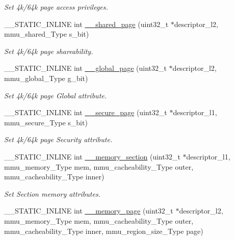 \begin{DoxyCompactItemize}
\begin{DoxyCompactList}\small\item\em Set 4k/64k page access privileges. \end{DoxyCompactList}\item 
\+\_\+\+\_\+\+S\+T\+A\+T\+I\+C\+\_\+\+I\+N\+L\+I\+NE int \hyperlink{group__MMU__Functions_gae48e2237412f51af7bdbd7d4d3d5125d}{\+\_\+\+\_\+shared\+\_\+page} (uint32\+\_\+t $\ast$descriptor\+\_\+l2, mmu\+\_\+shared\+\_\+\+Type s\+\_\+bit)
\begin{DoxyCompactList}\small\item\em Set 4k/64k page shareability. \end{DoxyCompactList}\item 
\+\_\+\+\_\+\+S\+T\+A\+T\+I\+C\+\_\+\+I\+N\+L\+I\+NE int \hyperlink{group__MMU__Functions_ga941feca37d9210110e090dc4ecd43ca5}{\+\_\+\+\_\+global\+\_\+page} (uint32\+\_\+t $\ast$descriptor\+\_\+l2, mmu\+\_\+global\+\_\+\+Type g\+\_\+bit)
\begin{DoxyCompactList}\small\item\em Set 4k/64k page Global attribute. \end{DoxyCompactList}\item 
\+\_\+\+\_\+\+S\+T\+A\+T\+I\+C\+\_\+\+I\+N\+L\+I\+NE int \hyperlink{group__MMU__Functions_ga27417dca4e862ec314c09fd2b89383ff}{\+\_\+\+\_\+secure\+\_\+page} (uint32\+\_\+t $\ast$descriptor\+\_\+l1, mmu\+\_\+secure\+\_\+\+Type s\+\_\+bit)
\begin{DoxyCompactList}\small\item\em Set 4k/64k page Security attribute. \end{DoxyCompactList}\item 
\+\_\+\+\_\+\+S\+T\+A\+T\+I\+C\+\_\+\+I\+N\+L\+I\+NE int \hyperlink{group__MMU__Functions_ga3883e7cea429d89d07e32fe69b241565}{\+\_\+\+\_\+memory\+\_\+section} (uint32\+\_\+t $\ast$descriptor\+\_\+l1, mmu\+\_\+memory\+\_\+\+Type mem, mmu\+\_\+cacheability\+\_\+\+Type outer, mmu\+\_\+cacheability\+\_\+\+Type inner)
\begin{DoxyCompactList}\small\item\em Set Section memory attributes. \end{DoxyCompactList}\item 
\+\_\+\+\_\+\+S\+T\+A\+T\+I\+C\+\_\+\+I\+N\+L\+I\+NE int \hyperlink{group__MMU__Functions_ga3eb167ca2d2e63c53a62ac1fb7cde793}{\+\_\+\+\_\+memory\+\_\+page} (uint32\+\_\+t $\ast$descriptor\+\_\+l2, mmu\+\_\+memory\+\_\+\+Type mem, mmu\+\_\+cacheability\+\_\+\+Type outer, mmu\+\_\+cacheability\+\_\+\+Type inner, mmu\+\_\+region\+\_\+size\+\_\+\+Type page)

\end{DoxyCompactItemize}
